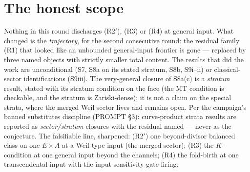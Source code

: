 \documentclass[11pt]{article}
\begin{document}
\section{The honest scope}

Nothing in this round discharges (R2$'$), (R3) or (R4) at general
input. What changed is the \emph{trajectory}, for the second consecutive
round: the residual family (R1) that looked like an unbounded
general-input frontier is gone --- replaced by three named objects with
strictly smaller total content. The results that did the work are
unconditional (S7, S8a on its stated stratum, S8b, S9i--ii) or
classical-sector identifications (S9iii). The very-general closure of
S8a(c) is a \emph{stratum} result, stated with its stratum condition on
the face (the MT condition is checkable, and the stratum is
Zariski-dense); it is not a claim on the special strata, where the
merged Weil sector lives and remains open. Per the campaign's banned
substitutes discipline (PROMPT \S3): curve-product strata results are
reported as \emph{sector/stratum} closures with the residual named ---
never as the conjecture. The falsifiable line, sharpened: (R2$'$) one
beyond-divisor balanced class on one $E\times A$ at a Weil-type input
(the merged sector); (R3) the $K$-condition at one general input beyond
the channels; (R4) the fold-birth at one transcendental input with the
input-sensitivity gate firing.
\end{document}
